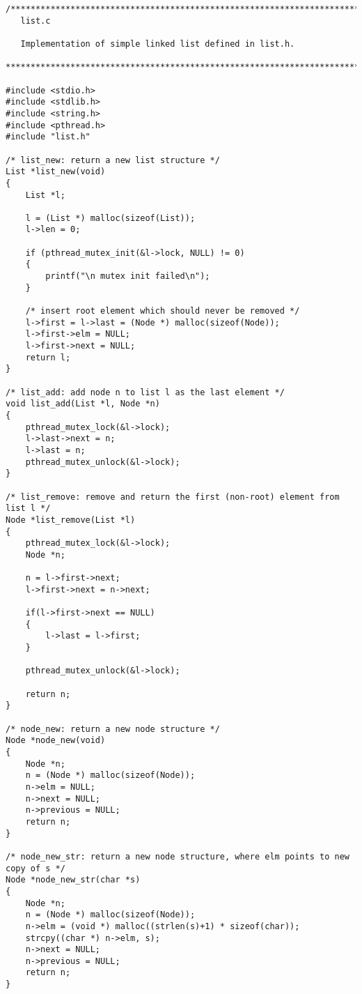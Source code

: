 \begin{lstlisting}
/******************************************************************************
   list.c

   Implementation of simple linked list defined in list.h.

******************************************************************************/

#include <stdio.h>
#include <stdlib.h>
#include <string.h>
#include <pthread.h>
#include "list.h"

/* list_new: return a new list structure */
List *list_new(void)
{
	List *l;

	l = (List *) malloc(sizeof(List));
	l->len = 0;

	if (pthread_mutex_init(&l->lock, NULL) != 0)
    {
        printf("\n mutex init failed\n");
    }
	
	/* insert root element which should never be removed */
	l->first = l->last = (Node *) malloc(sizeof(Node));
	l->first->elm = NULL;
	l->first->next = NULL;
	return l;
}

/* list_add: add node n to list l as the last element */
void list_add(List *l, Node *n)
{
	pthread_mutex_lock(&l->lock);
	l->last->next = n;
	l->last = n;
	pthread_mutex_unlock(&l->lock);
}

/* list_remove: remove and return the first (non-root) element from list l */
Node *list_remove(List *l)
{
	pthread_mutex_lock(&l->lock);
	Node *n;
	
	n = l->first->next;
	l->first->next = n->next;
	
	if(l->first->next == NULL)
	{
		l->last = l->first;
	}

	pthread_mutex_unlock(&l->lock);
	
	return n;
}

/* node_new: return a new node structure */
Node *node_new(void)
{
	Node *n;
	n = (Node *) malloc(sizeof(Node));
	n->elm = NULL;
	n->next = NULL;
	n->previous = NULL;
	return n;
}

/* node_new_str: return a new node structure, where elm points to new copy of s */
Node *node_new_str(char *s)
{
	Node *n;
	n = (Node *) malloc(sizeof(Node));
	n->elm = (void *) malloc((strlen(s)+1) * sizeof(char));
	strcpy((char *) n->elm, s);
	n->next = NULL;
	n->previous = NULL;
	return n;
}

\end{lstlisting}